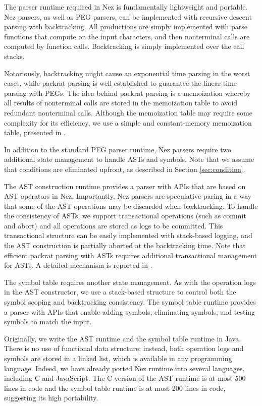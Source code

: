 \documentclass[preprint]{sigplanconf}
\begin{document}
The parser runtime required in Nez is fundamentally lightweight and portable. Nez parsers, as well as PEG parsers, can be implemented with recursive descent parsing with backtracking. All productions are simply implemented with parse functions that compute on the input characters, and then nonterminal calls are computed by function calls. Backtracking is simply implemented over the call stacks. 

Notoriously, backtracking might cause an exponential time parsing in the worst cases, while packrat parsing\cite{ICFP02_PackratParsing} is well established to guarantee the linear time parsing with PEGs. The idea behind packrat parsing is a memoization whereby  all results of nonterminal calls are stored in the memoization table to avoid redundant nonterminal calls. Although the memoization table may require some complexity for its efficiency,  we use a simple and constant-memory memoization table, presented in \cite{PRO101}. 

In addition to the standard PEG parser runtime, Nez parsers require two additional state management to handle ASTs and symbols. Note that we assume that conditions are eliminated upfront, as described in Section \ref{sec:condition}. 

The AST construction runtime provides a parser with APIs that are based on AST operators in Nez. Importantly, Nez parsers are speculative paring in a way that some of the AST operations may be discarded when backtracking. To handle the consistency of ASTs, we support  transactional operations (such as {\sf commit} and {\sf abort}) and all operations are stored as logs to be committed. This transactional structure can be easily implemented with stack-based logging, and the AST construction is partially aborted at the backtracking time. Note that efficient packrat parsing with ASTs requires additional transactional management for ASTs. A detailed mechanism is reported in \cite{ASTMachine}.

The symbol table requires another state management. As with the operation logs in the AST constructor, we use a stack-based structure to control both the symbol scoping and backtracking consistency. The symbol table runtime provides a parser with APIs that enable adding symbols, eliminating symbols, and testing symbols to match the input.

Originally, we write the AST runtime and the symbol table runtime in Java. There is no use of functional data structure; instead, both operation logs and symbols are stored in a linked list, which is available in any programming language. Indeed, we have already ported Nez runtime into several languages, including C and JavaScript. The C version of the AST runtime is at most 500 lines in code and the symbol table runtime is at most 200 lines in code, suggesting its high portability. 
\end{document}
